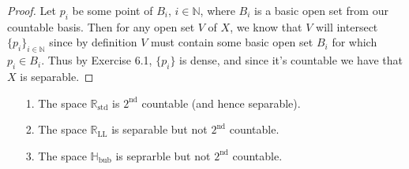 \documentclass[a4paper,12pt,twoside]{hmcpset}
\begin{document}
\begin{proof}
    Let $p_i$ be some point of $B_i$, $i \in \mathbb{N}$, where $B_i$ is a basic open set 
    from our countable basis. Then for any open set $V$ of $X$, 
    we know that $V$ will intersect $\{p_i\}_{i \in \mathbb{N}}$ 
    since by definition $V$ must contain some basic open set $B_i$ for 
    which $p_i \in B_i$. Thus by Exercise 6.1, $\{p_i\}$ is dense, and 
    since it's countable we have that $X$ is separable.
\end{proof}

\begin{exercise}[Exercise 6.10]
\begin{itemize}
\item[1.] The space $\mathbb{R}_{\text{std}}$ is $2^{\text{nd}}$
countable (and hence separable).

\item[2.] The space $\mathbb{R}_{\text{LL}}$ is separable but not
$2^\text{nd}$ countable.

\item[3.] The space $\mathbb{H}_{\text{bub}}$ is seprarble but not
$2^\text{nd}$ countable.
\end{itemize}
\end{exercise}
\end{document}
